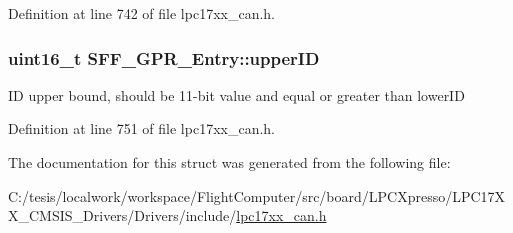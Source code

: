\-Definition at line 742 of file lpc17xx\-\_\-can.\-h.

\hypertarget{struct_s_f_f___g_p_r___entry_af1ec5d8c4fb3edd4e1191fa19fd4eced}{
\subsubsection[{upper\-I\-D}]{\setlength{\rightskip}{0pt plus 5cm}uint16\-\_\-t {\bf \-S\-F\-F\-\_\-\-G\-P\-R\-\_\-\-Entry\-::upper\-I\-D}}}\label{struct_s_f_f___g_p_r___entry_af1ec5d8c4fb3edd4e1191fa19fd4eced}
\-I\-D upper bound, should be 11-\/bit value and equal or greater than lower\-I\-D 

\-Definition at line 751 of file lpc17xx\-\_\-can.\-h.



\-The documentation for this struct was generated from the following file\-:\begin{DoxyCompactItemize}
\item 
\-C\-:/tesis/localwork/workspace/\-Flight\-Computer/src/board/\-L\-P\-C\-Xpresso/\-L\-P\-C17\-X\-X\-\_\-\-C\-M\-S\-I\-S\-\_\-\-Drivers/\-Drivers/include/\hyperlink{lpc17xx__can_8h}{lpc17xx\-\_\-can.\-h}\end{DoxyCompactItemize}
